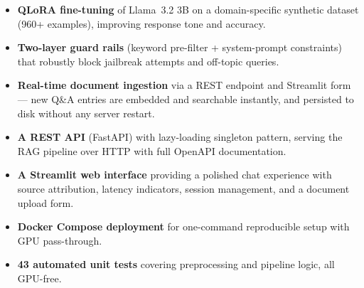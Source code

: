 \documentclass[12pt,a4paper]{article}
\begin{document}
\begin{itemize}
  \item \textbf{QLoRA fine-tuning} of Llama~3.2 3B on a domain-specific
        synthetic dataset (960+ examples), improving response tone and accuracy.
  \item \textbf{Two-layer guard rails} (keyword pre-filter + system-prompt
        constraints) that robustly block jailbreak attempts and off-topic queries.
  \item \textbf{Real-time document ingestion} via a REST endpoint and Streamlit
        form — new Q\&A entries are embedded and searchable instantly, and
        persisted to disk without any server restart.
  \item \textbf{A REST API} (FastAPI) with lazy-loading singleton pattern,
        serving the RAG pipeline over HTTP with full OpenAPI documentation.
  \item \textbf{A Streamlit web interface} providing a polished chat experience
        with source attribution, latency indicators, session management, and a
        document upload form.
  \item \textbf{Docker Compose deployment} for one-command reproducible setup
        with GPU pass-through.
  \item \textbf{43 automated unit tests} covering preprocessing and pipeline
        logic, all GPU-free.
\end{itemize}
\end{document}
